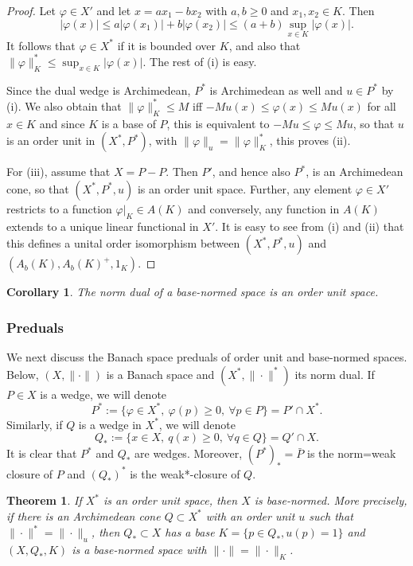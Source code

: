 \documentclass[12pt]{article}
\newtheorem{thm}{Theorem}
\newtheorem{coro}{Corollary}
\theoremstyle{remark}
\newcommand{\<}{\langle}
\begin{document}
\begin{proof} Let $\varphi\in X'$ and let $x=ax_1-bx_2$ with $a,b\ge 0$ and $x_1,x_2\in K$. Then
\[
|\varphi(x)|\le a|\varphi(x_1)|+b|\varphi(x_2)|\le (a+b)\sup_{x\in K}|\varphi(x)|.
\]
It follows that $\varphi\in X^*$ if it is bounded over $K$, and also that $\|\varphi\|_K^*\le\sup_{x\in K}|\varphi(x)|$. The rest of (i) is easy.

 Since the dual wedge is Archimedean, $P^*$ is Archimedean as well and $u\in P^*$ by (i). 
We also obtain that $\|\varphi\|_K^*\le M$ iff $-Mu(x)\le  \varphi(x)\le Mu(x)$ for all $x\in K$  and since $K$ is a base of $P$, this is equivalent to  
 $-Mu\le \varphi\le Mu$, so that $u$ is an order unit in $(X^*,P^*)$, with $\|\varphi\|_u= \|\varphi\|_K^*$, this proves (ii).

For (iii), assume that $X=P-P$. Then $P'$, and hence also $P^*$, is an Archimedean cone, so that $(X^*,P^*,u)$ is an order unit space.
Further, any element $\varphi\in X'$ restricts to a function $\varphi|_K\in A(K)$ and conversely, any 
function in $A(K)$ extends to a unique linear functional in $X'$. It is easy to see  from (i) and (ii) that this defines a unital order isomorphism between $(X^*,P^*,u)$ and 
$(A_b(K),A_b(K)^+,1_K)$.

\end{proof}

\begin{coro} The norm dual of a base-normed space is an order unit space.

\end{coro}




\subsubsection*{Preduals}

We next discuss the Banach space preduals of order unit and base-normed spaces. Below,  $(X,\|\cdot\|)$ is a Banach space and
$(X^*,\|\cdot\|^*)$ its norm dual.  If $P\in X$ is a wedge, we will denote 
\[
P^*:=\{\varphi\in X^*,\ \varphi(p)\ge 0,\ \forall p\in P\}= P'\cap X^*.
\]
Similarly, if $Q$ is a wedge in $X^*$, we will denote 
\[
Q_*:=\{x\in X,\ q(x)\ge 0,\ \forall q\in Q\}= Q'\cap X.
\]
It is clear that $P^*$ and $Q_*$ are wedges. Moreover, $(P^*)_*=\bar P$ is the norm=weak closure of $P$  and $(Q_*)^*$ is the weak*-closure of $Q$. 

\begin{thm}\cite{ellis, asell} If $X^*$ is an order unit space, then $X$ is base-normed. More precisely, 
if there is an Archimedean cone $Q\subset X^*$ with an order unit $u$  such that $\|\cdot\|^*=\|\cdot\|_u$, 
 then  $Q_*\subset X$ has a base $K=\{p\in Q_*, u(p)=1\}$ and $(X,Q_*,K)$ is a base-normed 
space with $\|\cdot\|=\|\cdot\|_K$.

\end{thm}
\end{document}
